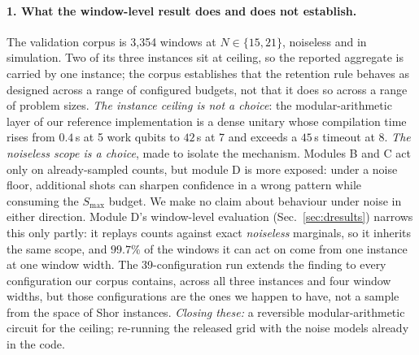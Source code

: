 \documentclass[final,5p,times,longtitle]{elsarticle}
\newcommand{\Smax}{S_{\max}}
\begin{document}
\paragraph{1. What the window-level result does and does not establish.}
The validation corpus is 3{,}354 windows at $N\in\{15,21\}$, noiseless and
in simulation. Two of its three instances sit at ceiling, so the reported
aggregate is carried by one instance; the corpus establishes that the
retention rule behaves as designed across a range of configured budgets,
not that it does so across a range of problem sizes. \emph{The instance
ceiling is not a choice}: the modular-arithmetic layer of our reference
implementation is a dense unitary whose compilation time rises from
$0.4$\,s at 5 work qubits to $42$\,s at 7 and exceeds a $45$\,s timeout at
8. \emph{The noiseless scope is a choice}, made to isolate the mechanism.
Modules B and C act only on already-sampled counts, but module D is more
exposed: under a noise floor, additional shots can sharpen confidence in a
wrong pattern while consuming the $\Smax$ budget. We make no claim about
behaviour under noise in either direction. Module D's window-level
evaluation (Sec.~\ref{sec:dresults}) narrows this only partly: it replays
counts against exact \emph{noiseless} marginals, so it inherits the same
scope, and $99.7\%$ of the windows it can act on come from one instance at
one window width. The 39-configuration run extends the finding to every
configuration our corpus contains, across all three instances and four
window widths, but those configurations are the ones we happen to have, not
a sample from the space of Shor instances. \emph{Closing these:} a
reversible modular-arithmetic circuit \cite{cuccaro2004} for the ceiling;
re-running the released grid with the noise models already in the code.
\end{document}
